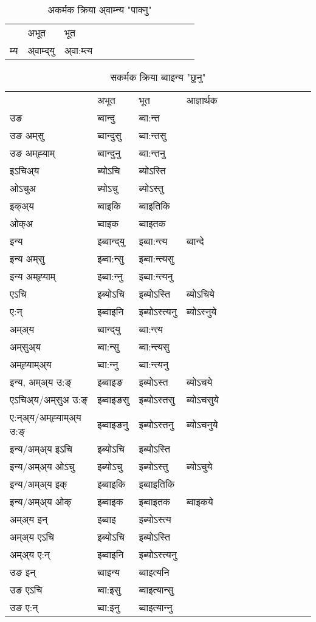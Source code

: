 \begin{table}[H]
\centering
\caption{\label{omt.vt} अकर्मक क्रिया  अ्वाम्‍न्य  "पाक्नु"  }
\begin{tabular}{l|l|l|l|l|l|l|l|l|l|l|l|l}  \toprule
&अभूत & भूत   \\ 
म्य & अ्वाम्द्‌यु  & अ्वा:म्त्य  \\ 
\bottomrule
\end{tabular}
\end{table}


\begin{table}[H]
\centering
\caption{\label{ont.vt} सकर्मक क्रिया  ब्वाइन्य  "छुनु"  }
\begin{tabular}{l|l|l|l|l|l|l|l|l|l|l|l|l}  \toprule
&अभूत & भूत & आज्ञार्थक \\ 
उङ &ब्वान्दु &ब्वा:न्त \\ 
उङ अम्‌सु&ब्वान्दुसु &ब्वा:न्तसु \\ 
उङ अम्‌ह्‍याम्&ब्वान्दुनु &ब्वा:न्तनु \\ 
इऽचिअ्य &ब्योऽचि &ब्योऽस्ति   \\ 
ओऽचुअ        &ब्योऽचु &ब्योऽस्तु   \\ 
इक्अ्य&ब्वाइकि &ब्वाइतिकि   \\ 
ओक्अ &ब्वाइक &ब्वाइतक   \\ 
इन्य & इब्वान्द्‌यु  & इब्वा:न्त्य &ब्वान्दे  \\ 
इन्य अम्‌सु& इब्वा:न्सु  & इब्वा:न्त्यसु   \\ 
इन्य अम्‌ह्‍याम्& इब्वा:न्‍नु  & इब्वा:न्त्यनु   \\ 
एऽचि & इब्योऽचि & इब्योऽस्ति &ब्योऽचिये    \\ 
ए:न् & इब्वाइनि  & इब्योऽस्त्यनु &ब्योऽस्‍नुये  \\ 
अम्अ्य & ब्वान्द्‌यु  & ब्वा:न्त्य  \\ 
अम्‌सुअ्य & ब्वा:न्सु & ब्वा:न्त्यसु  \\ 
अम्‌ह्‍याम्अ्य & ब्वा:न्‍नु  & ब्वा:न्त्यनु \\ 
\midrule
इन्य, अम्अ्य उ:ङ्‌ &इब्वाइङ &इब्योऽस्त &ब्योऽचये \\ 
एऽचिअ्य/अम्‌सुअ उ:ङ्‌ &इब्वाइङसु &इब्योऽस्तसु &ब्योऽचसुये \\ 
ए:न्अ्य/अम्‌ह्‍याम्अ्य उ:ङ्‌ &इब्वाइङनु &इब्योऽस्तनु &ब्योऽचनुये \\ 
इन्य/अम्अ्य इऽचि &इब्योऽचि &इब्योऽस्ति    \\ 
इन्य/अम्अ्य ओऽचु &इब्योऽचु &इब्योऽस्तु  &ब्योऽचुये  \\ 
इन्य/अम्अ्य इक् &इब्वाइकि &इब्वाइतिकि   \\ 
इन्य/अम्अ्य ओक् &इब्वाइक &इब्वाइतक  &ब्वाइकये  \\ 
अम्अ्य इन् & इब्वाइ & इब्योऽस्त्य   \\ 
अम्अ्य एऽचि & इब्योऽचि & इब्योऽस्ति    \\ 
अम्अ्य ए:न् & इब्वाइनि  & इब्योऽस्त्यनु  \\ 
\midrule
उङ इन् & ब्वाइन्य  & ब्वाइत्यनि  \\ 
उङ एऽचि & ब्वा:इसु  & ब्वाइत्यान्सु   \\ 
उङ ए:न्& ब्वा:इनु  & ब्वाइत्यान्‍नु   \\ 
\bottomrule
\end{tabular}
\end{table}


